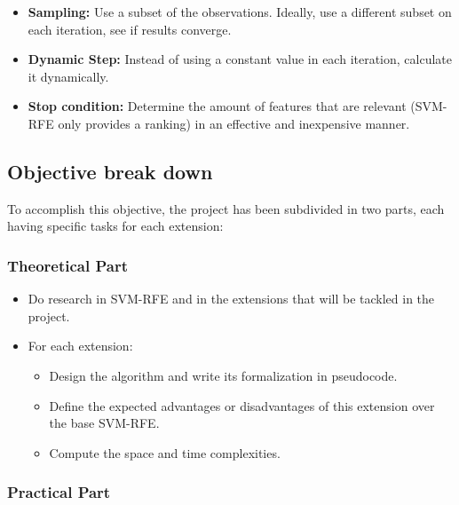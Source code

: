 \begin{itemize}
    \item \textbf{Sampling:} Use a subset of the observations. Ideally, use a different subset on each iteration, see if results converge.
    \item \textbf{Dynamic Step:} Instead of using a constant value in each iteration, calculate it dynamically.
    \item \textbf{Stop condition:} Determine the amount of features that are relevant (SVM-RFE only provides a ranking) in an effective and inexpensive manner.
\end{itemize}

\subsection{Objective break down}

To accomplish this objective, the project has been sub\-divided in two parts, each having specific tasks for each extension:

\subsubsection*{Theoretical Part}

\begin{itemize}
    \item Do research in SVM-RFE and in the extensions that will be tackled in the project.
    \item {
        For each extension:
        \begin{itemize}
            \item Design the algorithm and write its formalization in pseudocode.
            \item Define the expected advantages or disadvantages of this extension over the base SVM-RFE.
            \item Compute the space and time complexities.
        \end{itemize}
    }
\end{itemize}

\subsubsection*{Practical Part}

